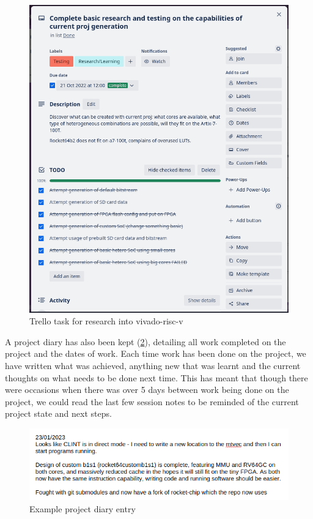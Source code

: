 \begin{figure}[h!]
    \centering
    \includegraphics[width=\textwidth]{img/trello.png}
    \caption{Trello task for research into vivado-risc-v\cite{vivado-risc-v}}
    \label{fig:trello}
\end{figure}

A project diary has also been kept (\ref{fig:diary}), detailing all work completed on the project and the dates of work. Each time work has been done on the project, we have written what was achieved, anything new that was learnt and the current thoughts on what needs to be done next time. This has meant that though there were occasions when there was over 5 days between work being done on the project, we could read the last few session notes to be reminded of the current project state and next steps.

\begin{figure}
    \centering
    \includegraphics[width=\textwidth]{img/example_diary_entry.png}
    \caption{Example project diary entry}
    \label{fig:diary}
\end{figure}
